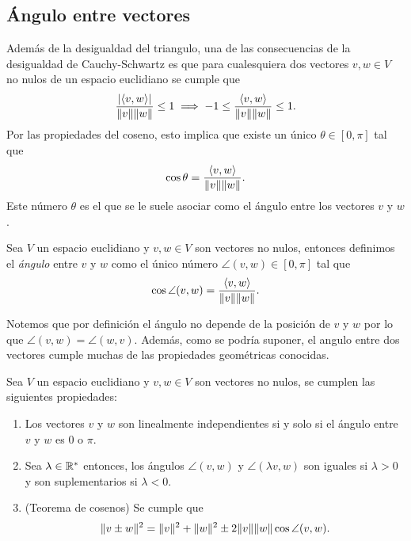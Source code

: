 \subsection{Ángulo entre vectores}

Además de la desigualdad del triangulo, una de las consecuencias de la desigualdad de Cauchy-Schwartz es que para cualesquiera dos vectores $v,w \in V$ no nulos de un espacio euclidiano se cumple que
\[
  \frac{\mathopen|\langle v,w\rangle\mathclose|}{\mathopen\|v\mathclose\|\mathopen\|w\mathclose\|} \leq 1 \implies  -1 \leq \frac{\langle v,w\rangle}{\mathopen\|v\mathclose\|\mathopen\|w\mathclose\|} \leq 1.
\]
Por las propiedades del coseno, esto implica que existe un único $\theta \in [0,\pi]$ tal que 
\[
  \cos\theta = \frac{\langle v,w\rangle}{\mathopen\|v\mathclose\|\mathopen\|w\mathclose\|}.
\]
Este número $\theta$ es el que se le suele asociar como el ángulo entre los vectores $v$ y $w$.

\begin{defi}
  Sea $V$ un espacio euclidiano y $v,w \in V$ son vectores no nulos, entonces definimos el \emph{ángulo} entre $v$ y $w$ como el único número $\angle(v,w) \in [0,\pi]$ tal que
    \[ \cos\angle(v,w) = \frac{\langle v,w\rangle}{\mathopen\|v\mathclose\|\mathopen\|w\mathclose\|}. \]
\end{defi}

Notemos que por definición el ángulo no depende de la posición de $v$ y $w$ por lo que $\angle(v,w) = \angle(w,v)$. Además, como se podría suponer, el angulo entre dos vectores cumple muchas de las propiedades geométricas conocidas.

\begin{teor}
  Sea $V$ un espacio euclidiano y $v,w \in V$ son vectores no nulos, se cumplen las siguientes propiedades:
  \begin{enumerate}
    \item Los vectores $v$ y $w$ son linealmente independientes si y solo si el ángulo entre $v$ y $w$ es $0$ o $\pi$.
    \item Sea $\lambda \in \mathbb{R}^*$ entonces, los ángulos $\angle(v,w)$ y $\angle(\lambda v,w)$ son iguales si $\lambda > 0$ y son suplementarios si $\lambda < 0$.
    \item (Teorema de cosenos) Se cumple que
      \[ \mathopen\|v \pm w\mathclose\|^2 = \mathopen\|v\mathclose\|^2 + \mathopen\|w\mathclose\|^2 \pm 2\mathopen\|v\mathclose\|\mathopen\|w\mathclose\|\cos\angle(v,w). \]
  \end{enumerate}
\end{teor}


